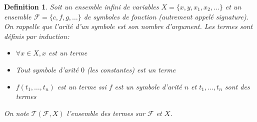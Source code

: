 \documentclass{paper}
\newtheorem{defi}{Definition}
\begin{document}
\begin{defi}
    Soit un ensemble infini de variables $X = \{x,y,x_1,x_2,\dots \}$ et un ensemble $\mathcal{F}=\{c,f,g,\dots \}$ de symboles de fonction (autrement appelé signature).
    On rappelle que l'arité d'un symbole est son nombre d'argument.
    Les termes sont définis par induction:
    \begin{itemize}
        \item $\forall x\in X, x$ est un terme
        \item Tout symbole d'arité $0$ (les constantes) est un terme
        \item $f(t_1,\dots,t_n)$ est un terme ssi $f$ est un symbole d'arité $n$ et $t_1,\dots,t_n$ sont des termes
    \end{itemize} 
    On note $\mathcal{T}(\mathcal{F}, X)$ l'ensemble des termes sur $\mathcal{F}$ et $X$.
\end{defi}
\end{document}
